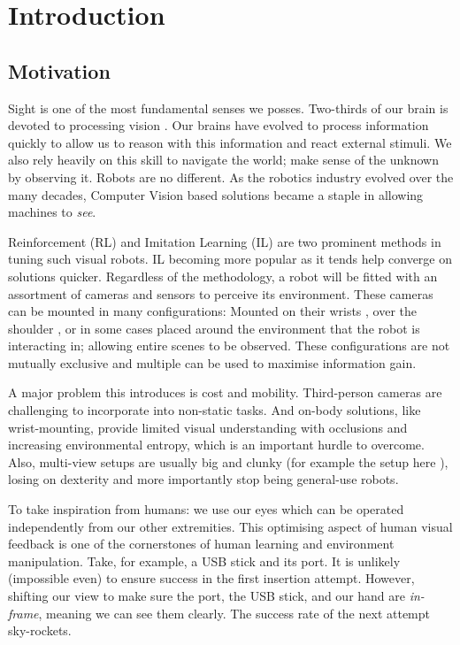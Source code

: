 \chapter{Introduction}
\section{Motivation}
    
  Sight is one of the most fundamental senses we posses. Two-thirds of our brain is devoted to processing vision \cite{fixot1957ophthalmology}. Our brains have evolved to process information quickly to allow us to reason with this information and react external stimuli. We also rely heavily on this skill to navigate the world; make sense of the unknown by observing it. Robots are no different. As the robotics industry evolved over the many decades, Computer Vision based solutions became a staple in allowing machines to \emph{see}.

  Reinforcement (RL) \cite{silver2015} and Imitation Learning (IL) \cite{attia2018globaloverviewimitationlearning, ARGALL2009469} are two prominent methods in tuning such visual robots. IL becoming more popular as it tends help converge on solutions quicker. Regardless of the methodology, a robot will be fitted with an assortment of cameras and sensors to perceive its environment. These cameras can be mounted in many configurations: Mounted on their wrists \cite{chi2024UMIinthewild,openXEmbodimentRoboticLearning2024}, over the shoulder \cite{wang2024observeactasynchronousactive}, or in some cases placed around the environment \cite{exploringActiveVision2024chuang} that the robot is interacting in; allowing entire scenes to be observed. These configurations are not mutually exclusive and multiple can be used to maximise information gain. 
  
  A major problem this introduces is cost and mobility. Third-person cameras are challenging to incorporate into non-static tasks. And on-body solutions, like wrist-mounting, provide limited visual understanding with occlusions and increasing environmental entropy, which is an important hurdle to overcome. Also, multi-view setups are usually big and clunky (for example the setup here \cite{zhao2024alohaunleashed}), losing on dexterity and more importantly stop being general-use robots.

  To take inspiration from humans: we use our eyes which can be operated independently from our other extremities. This optimising aspect of human visual feedback \cite{findlay2003active,maiello2021humans,goodman2018using} is one of the cornerstones of human learning and environment manipulation. Take, for example, a USB stick and its port. It is unlikely (impossible even) to ensure success in the first insertion attempt. However, shifting our view to make sure the port, the USB stick, and our hand are \emph{in-frame}, meaning we can see them clearly. The success rate of the next attempt sky-rockets.
  
